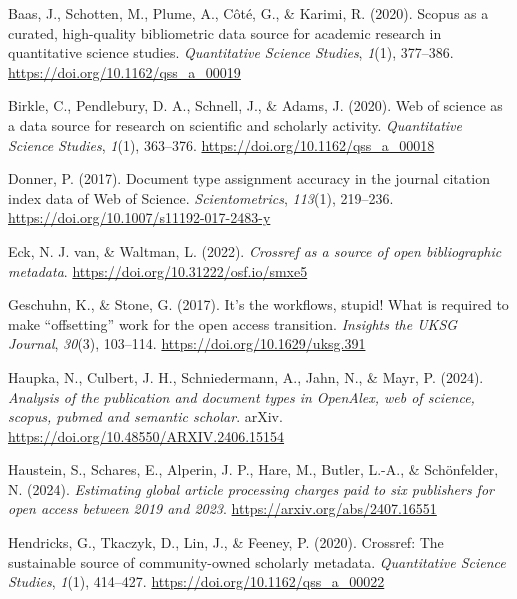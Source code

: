 \documentclass[a4paper,man,floatsintext,longtable,noextraspace,10pt]{apa6}
\newlength{\cslhangindent}
\newenvironment{CSLReferences}[2] %
{\begin{list}{}{%
  \setlength{\itemindent}{0pt}
  \setlength{\leftmargin}{0pt}
  \setlength{\parsep}{0pt}
  \ifodd #1
  \setlength{\leftmargin}{\cslhangindent}
  \setlength{\itemindent}{-1\cslhangindent}
  \fi
  \setlength{\itemsep}{#2\baselineskip}}}
{\end{list}}
\begin{document}
\label{refs}
\begin{CSLReferences}{1}{0}
Baas, J., Schotten, M., Plume, A., Côté, G., \& Karimi, R. (2020).
Scopus as a curated, high-quality bibliometric data source for academic
research in quantitative science studies. \emph{Quantitative Science
Studies}, \emph{1}(1), 377--386.
\url{https://doi.org/10.1162/qss_a_00019}

Birkle, C., Pendlebury, D. A., Schnell, J., \& Adams, J. (2020). Web of
science as a data source for research on scientific and scholarly
activity. \emph{Quantitative Science Studies}, \emph{1}(1), 363--376.
\url{https://doi.org/10.1162/qss_a_00018}

Donner, P. (2017). Document type assignment accuracy in the journal
citation index data of {Web of Science}. \emph{Scientometrics},
\emph{113}(1), 219--236. \url{https://doi.org/10.1007/s11192-017-2483-y}

Eck, N. J. van, \& Waltman, L. (2022). \emph{Crossref as a source of
open bibliographic metadata}.
\url{https://doi.org/10.31222/osf.io/smxe5}

Geschuhn, K., \& Stone, G. (2017). It's the workflows, stupid! What is
required to make {``offsetting''} work for the open access transition.
\emph{Insights the {UKSG} Journal}, \emph{30}(3), 103--114.
\url{https://doi.org/10.1629/uksg.391}

Haupka, N., Culbert, J. H., Schniedermann, A., Jahn, N., \& Mayr, P.
(2024). \emph{Analysis of the publication and document types in
OpenAlex, web of science, scopus, pubmed and semantic scholar}. arXiv.
\url{https://doi.org/10.48550/ARXIV.2406.15154}

Haustein, S., Schares, E., Alperin, J. P., Hare, M., Butler, L.-A., \&
Schönfelder, N. (2024). \emph{Estimating global article processing
charges paid to six publishers for open access between 2019 and 2023}.
\url{https://arxiv.org/abs/2407.16551}

Hendricks, G., Tkaczyk, D., Lin, J., \& Feeney, P. (2020). Crossref: The
sustainable source of community-owned scholarly metadata.
\emph{Quantitative Science Studies}, \emph{1}(1), 414--427.
\url{https://doi.org/10.1162/qss_a_00022}


\end{CSLReferences}
\end{document}
